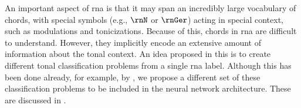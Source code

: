 
An important aspect of \gls{rna} is that it may span an
incredibly large vocabulary of chords, with special symbols
(e.g., $\rnN$ or $\rnGer$) acting in special context, such
as modulations and tonicizations. Because of this, chords in
\gls{rna} are difficult to understand. However, they
implicitly encode an extensive amount of information about
the tonal context. An idea proposed in this \thesisdiss{} is
to create different tonal classification problems from a
single \gls{rna} label. Although this has been done already,
for example, by \textcite{chen2018functional}, we propose a
different set of these classification problems to be
included in the neural network architecture. These are
discussed in .
